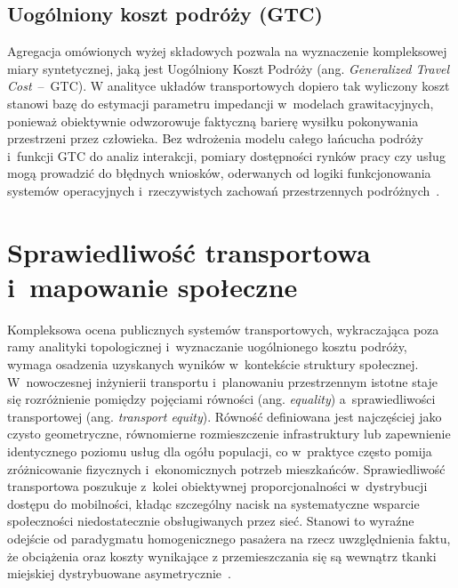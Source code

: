 \documentclass{pracamgr}
\begin{document}
\subsection{Uogólniony koszt podróży (GTC)}\label{subsection:gtc}
Agregacja omówionych wyżej składowych pozwala na wyznaczenie kompleksowej miary syntetycznej, jaką jest Uogólniony Koszt Podróży (ang. \textit{Generalized Travel Cost}~–~GTC). W analityce układów transportowych dopiero tak wyliczony koszt stanowi bazę do estymacji parametru impedancji w~modelach grawitacyjnych, ponieważ obiektywnie odwzorowuje faktyczną barierę wysiłku pokonywania przestrzeni przez człowieka. Bez wdrożenia modelu całego łańcucha podróży i~funkcji GTC do analiz interakcji, pomiary dostępności rynków pracy czy usług mogą prowadzić do błędnych wniosków, oderwanych od logiki funkcjonowania systemów operacyjnych i~rzeczywistych zachowań przestrzennych podróżnych~\cite{LUO2019102505}.


\section{Sprawiedliwość transportowa i~mapowanie społeczne}\label{section:sprawiedliwość}

Kompleksowa ocena publicznych systemów transportowych, wykraczająca poza ramy analityki topologicznej i~wyznaczanie uogólnionego kosztu podróży, wymaga osadzenia uzyskanych wyników w~kontekście struktury społecznej. W~nowoczesnej inżynierii transportu i~planowaniu przestrzennym istotne staje się rozróżnienie pomiędzy pojęciami równości (ang. \textit{equality}) a~sprawiedliwości transportowej (ang. \textit{transport equity}). Równość definiowana jest najczęściej jako czysto geometryczne, równomierne rozmieszczenie infrastruktury lub zapewnienie identycznego poziomu usług dla ogółu populacji, co w~praktyce często pomija zróżnicowanie fizycznych i~ekonomicznych potrzeb mieszkańców. Sprawiedliwość transportowa poszukuje z~kolei obiektywnej proporcjonalności w~dystrybucji dostępu do mobilności, kładąc szczególny nacisk na systematyczne wsparcie społeczności niedostatecznie obsługiwanych przez sieć. Stanowi to wyraźne odejście od paradygmatu homogenicznego pasażera na rzecz uwzględnienia faktu, że obciążenia oraz koszty wynikające z przemieszczania się są wewnątrz tkanki miejskiej dystrybuowane asymetrycznie~\cite{KHALIFE2023160, elavating}.
\end{document}
